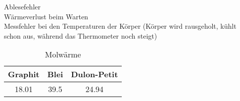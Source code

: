 Ablesefehler \\
Wärmeverlust beim Warten \\
Messfehler bei den Temperaturen der Körper (Körper wird rausgeholt, kühlt schon aus, während das Thermometer noch steigt) \\

\begin{table}[h]
\begin{center}
\begin{tabular}{c | c | c}
	Graphit & Blei & Dulon-Petit \\
	\hline
	18.01 & 39.5 & 24.94
\end{tabular}
\end{center}
\caption{Molwärme}
\end{table}

